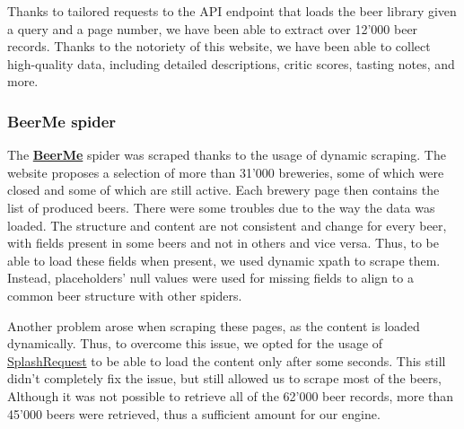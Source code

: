 Thanks to tailored requests to the API endpoint that loads the beer library given a query and a page number, we have been able to extract over 12'000 beer records. Thanks to the notoriety of this website, we have been able to collect high-quality data, including detailed descriptions, critic scores, tasting notes, and more.


\subsubsection{BeerMe spider}

The \href{https://beerme.com/beerlist.php}{\textbf{BeerMe}} spider was scraped thanks to the usage of dynamic scraping. The website proposes a selection of more than 31'000 breweries, some of which were closed and some of which are still active. Each brewery page then contains the list of produced beers. There were some troubles due to the way the data was loaded. The structure and content are not consistent and change for every beer, with fields present in some beers and not in others and vice versa. Thus, to be able to load these fields when present, we used dynamic xpath to scrape them. Instead, placeholders' null values were used for missing fields to align to a common beer structure with other spiders. 

Another problem arose when scraping these pages, as the content is loaded dynamically. Thus, to overcome this issue, we opted for the usage of \href{https://github.com/scrapy-plugins/scrapy-splash#requests}{SplashRequest} to be able to load the content only after some seconds. This still didn't completely fix the issue, but still allowed us to scrape most of the beers, Although it was not possible to retrieve all of the 62'000 beer records, more than 45'000 beers were retrieved, thus a sufficient amount for our engine.
